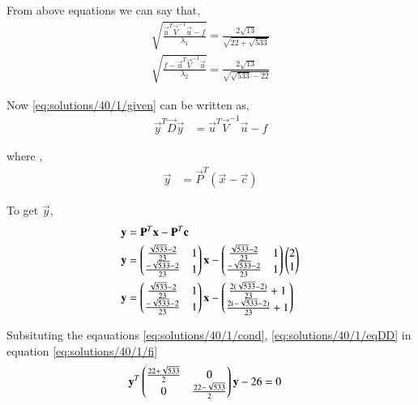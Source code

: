 From above equations we can say that,
\begin{align}
\sqrt{\frac{\vec{u}^T\vec{V}^{-1}\vec{u}-f}{\lambda_1}}=\frac{2\sqrt{13}}{\sqrt{22+\sqrt{533}}}\\
\sqrt{\frac{f-\vec{u}^T\vec{V}^{-1}\vec{u}}{\lambda_2}}=\frac{2\sqrt{13}}{\sqrt{\sqrt{533}-22}}
\end{align}

Now \eqref{eq:solutions/40/1/given} can be written as,
\begin{align}
    \vec{y}^T\vec{D}\vec{y}&=\vec{u}^T\vec{V}^{-1}\vec{u}-f\label{eq:solutions/40/1/fi}
\end{align}

where ,
\begin{align}
    \vec{y}&=\vec{P}^T(\vec{x}-\vec{c})
\end{align}

To get $\vec{y}$,
\begin{align}
\mathbf{y}&=\mathbf{P}^T\mathbf{x}-\mathbf{P}^T\mathbf{c}\\
    \mathbf{y}&=\begin{pmatrix}\frac{\sqrt{533}-2}{23} & 1 \\ \frac{-\sqrt{533}-2}{23} & 1\end{pmatrix}\mathbf{x}-\begin{pmatrix}\frac{\sqrt{533}-2}{23} & 1 \\ \frac{-\sqrt{533}-2}{23} & 1\end{pmatrix}\begin{pmatrix}2\\1\end{pmatrix}\\
    \mathbf{y}&=\begin{pmatrix}\frac{\sqrt{533}-2}{23} & 1 \\ \frac{-\sqrt{533}-2}{23} & 1\end{pmatrix}\mathbf{x}-\begin{pmatrix}\frac{2(\sqrt{533}-2)}{23}+1  \\ \frac{2(-\sqrt{533}-2)}{23} + 1\end{pmatrix}
\end{align}

Subsituting the eqauations \eqref{eq:solutions/40/1/cond}, \eqref{eq:solutions/40/1/eqDD} in equation \eqref{eq:solutions/40/1/fi}
\begin{align}
    \mathbf{y}^T\begin{pmatrix}\frac{22+\sqrt{533}}{2} & 0\\0 & \frac{22-\sqrt{533}}{2}\end{pmatrix}\mathbf{y}-26&=0
\end{align}

